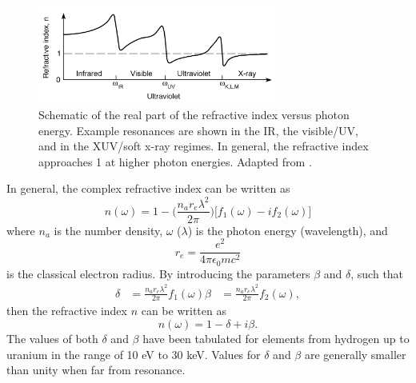 \begin{figure}
	\centering
	\includegraphics[width=0.7\textwidth]{figures/refractive_index/attwood_real_n_schematic.png}
	\caption{Schematic of the real part of the refractive index versus photon energy. Example resonances are shown in the IR, the visible/UV, and in the XUV/soft x-ray regimes. In general, the refractive index approaches 1 at higher photon energies.  Adapted from \cite{attwoodSoftXraysExtreme2000}.}
	\label{fig:refractive_index_schematic}
\end{figure}

In general, the complex refractive index can be written as\cite{attwoodSoftXraysExtreme2000}
\begin{equation}
\label{eqn:refractive_index}
	n(\omega)=1 - \bigg(\frac{n_a r_e \lambda^2}{2\pi}\bigg)\bigg[f_1(\omega) - i f_2(\omega)\bigg]
\end{equation}
where $n_a$ is the number density, $\omega$ ($\lambda$) is the photon energy (wavelength), and
\begin{equation}
\label{eqn:r_e}
	r_e = \frac{e^2}{4\pi\epsilon_0 mc^2}
\end{equation}
is the classical electron radius. By introducing the parameters $\beta$ and $\delta$, such that
\begin{equation}
\label{eqn:delta_beta_def}
	\begin{aligned}
	\delta &= \frac{n_a r_e \lambda^2}{2\pi}f_1(\omega)
	\beta & = \frac{n_a r_e \lambda^2}{2\pi}f_2(\omega),
	\end{aligned}
\end{equation}
then the refractive index $n$ can be written as
\begin{equation}
\label{eqn:refractive_index_db}
	n(\omega)=1-\delta+i\beta.
\end{equation}
The values of both $\delta$ and $\beta$ have been tabulated for elements from hydrogen up to uranium in the range of 10 eV to 30 keV\cite{henkeLowenergyXrayInteraction1982}.  Values for $\delta$ and $\beta$ are generally smaller than unity when far from resonance.

